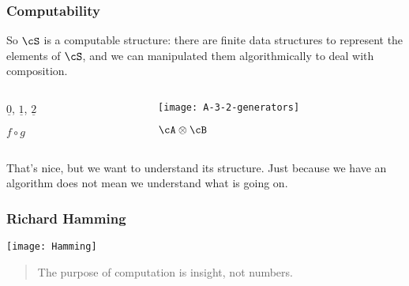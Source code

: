 \documentclass[handout,10pt]{ksbeamer}
\let\emph=\alert
\def\F#1{\underline{#1}}
\begin{document}
\begin{frame}
\frametitle{Computability}

So $\cS$ is a \emph{computable structure}:  there are finite data structures
to represent the elements of $\cS$, and we can manipulated them algorithmically
to deal with composition.
\vspace{5ex}


\begin{columns}
\begin{column}{0.2\textwidth}

  $\F{0}$, $\F{1}$, $\F{2}$
  \vspace{10ex}

  $f \circ g$
  
\end{column}

\begin{column}{0.7\textwidth}

  \texttt{[image: A-3-2-generators]}
  \vspace{1ex}

\qquad\qquad\qquad  $\cA \otimes \cB$

\end{column}
\end{columns}
\vspace{5ex}

That's nice, but we want to understand its structure.
Just because we have an algorithm does not mean we understand
what is going on. 

\end{frame}



\begin{frame}
\frametitle{Richard Hamming}

\begin{center}
   \texttt{[image: Hamming]}
\end{center}

\begin{quotation}
  The purpose of computation is insight, not numbers. 
\end{quotation}

\end{frame}
\end{document}

